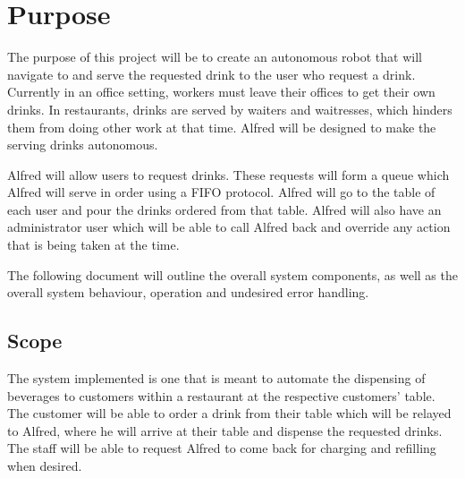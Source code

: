 \documentclass [10pt]{article}
\begin{document}
\pagebreak



\section {Purpose}

The purpose of this project will be to create an autonomous robot that will navigate to and serve
the requested drink to the user who request a drink. Currently in an office setting, workers must
leave their offices to get their own drinks. In restaurants, drinks are served by waiters and
waitresses, which hinders them from doing other work at that time. Alfred will be designed to make the serving drinks autonomous.\newline

Alfred will allow users to request drinks. These requests will form a queue which Alfred will serve in order using a FIFO protocol. Alfred will go to the table of each user and pour the drinks ordered from that table. Alfred will also have an administrator user which will be able to call Alfred back and override any action that is being taken at the time.\newline

The following document will outline the overall system components, as well as the overall system behaviour, operation and undesired error handling.


\subsection{Scope}

The system implemented is one that is meant to automate the dispensing of beverages to customers within a restaurant at the respective customers' table. The customer will be able to order a drink from their table which will be relayed to Alfred, where he will arrive at their table and dispense the requested drinks. The staff will be able to request Alfred to come back for charging and refilling when desired.
\end{document}
